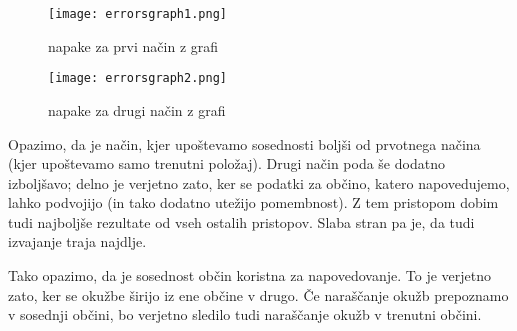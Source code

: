 \documentclass{article}
\begin{document}
\begin{figure}[htb]
        \texttt{[image: errorsgraph1.png]}
        \caption{napake za prvi način z grafi}
    \end{figure}

    \begin{figure}[htb]
        \texttt{[image: errorsgraph2.png]}
        \caption{napake za drugi način z grafi}
    \end{figure}

Opazimo, da je način, kjer upoštevamo sosednosti boljši od prvotnega načina (kjer upoštevamo samo trenutni položaj). Drugi način poda še dodatno izboljšavo; delno je verjetno zato, ker se podatki za občino, katero napovedujemo, lahko podvojijo (in tako dodatno utežijo pomembnost). Z tem pristopom dobim tudi najboljše rezultate od vseh ostalih pristopov. Slaba stran pa je, da tudi izvajanje traja najdlje.

Tako opazimo, da je sosednost občin koristna za napovedovanje. To je verjetno zato, ker se okužbe širijo iz ene občine v drugo. Če naraščanje okužb prepoznamo v sosednji občini, bo verjetno sledilo tudi naraščanje okužb v trenutni občini.
\end{document}
